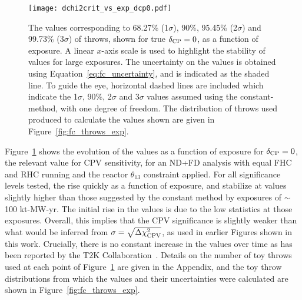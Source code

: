 \begin{figure}[htbp]
  \centering
  \texttt{[image: dchi2crit\_vs\_exp\_dcp0.pdf]}
  \caption{The \dchisqcrit values corresponding to 68.27\% (1$\sigma$), 90\%, 95.45\% (2$\sigma$) and 99.73\% (3$\sigma$) of throws, shown for true $\delta_{\rm CP} = 0$, as a function of exposure. A linear $x$-axis scale is used to highlight the stability of \dchisqcrit values for large exposures. The uncertainty on the \dchisqcrit values is obtained using Equation~\ref{eq:fc_uncertainty}, and is indicated as the shaded line. To guide the eye, horizontal dashed lines are included which indicate the 1$\sigma$, 90\%, 2$\sigma$ and 3$\sigma$ \dchisq values assumed using the constant-\dchisq method, with one degree of freedom. The distribution of throws used produced to calculate the \dchisqcrit values shown are given in Figure~\ref{fig:fc_throws_exp}.}
  \label{fig:fc_vs_exp}
\end{figure}
Figure~\ref{fig:fc_vs_exp} shows the evolution of the \dchisqcrit values as a function of exposure for $\delta_{\rm CP} = 0$, the relevant value for CPV sensitivity, for an ND+FD analysis with equal FHC and RHC running and the reactor $\theta_{13}$ constraint applied.
For all significance levels tested, the \dchisqcrit rise quickly as a function of exposure, and stabilize at values slightly higher than those suggested by the constant \dchisq method by exposures of $\sim$100 kt-MW-yr. The initial rise in the \dchisqcrit values is due to the low statistics at those exposures. Overall, this implies that the CPV significance is slightly weaker than what would be inferred from $\sigma = \sqrt{\Delta\chi^{2}_{\mathrm{CPV}}}$, as used in earlier Figures shown in this work. Crucially, there is no constant increase in the \dchisqcrit values over time as has been reported by the T2K Collaboration~\cite{Abe:2021gky}. Details on the number of toy throws used at each point of Figure~\ref{fig:fc_vs_exp} are given in the Appendix, and the toy throw distributions from which the \dchisqcrit values and their uncertainties were calculated are shown in Figure~\ref{fig:fc_throws_exp}.

